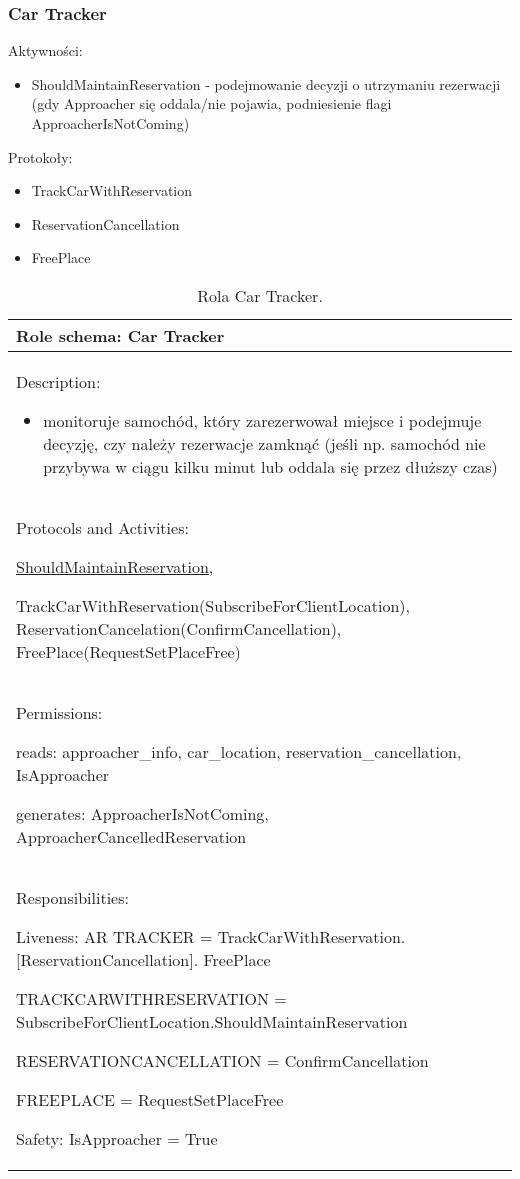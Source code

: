 \newpage
\subsubsection{Car Tracker}

Aktywności:
\begin{itemize}
    \item ShouldMaintainReservation - podejmowanie decyzji o utrzymaniu rezerwacji (gdy Approacher się oddala/nie pojawia, podniesienie flagi ApproacherIsNotComing)
\end{itemize}

Protokoły:
\begin{itemize}
    \item TrackCarWithReservation 
    \item ReservationCancellation
    \item FreePlace 
\end{itemize}


\begin{table}[!h] \label{tab:rola1} \centering
    \caption{Rola Car Tracker.}
    \begin{tabular} {| p{14cm} |} \hline
        Role schema: Car Tracker \\ \hline
        Description:

        \begin{itemize}
            \item monitoruje samochód, który zarezerwował miejsce i podejmuje decyzję, czy należy rezerwacje zamknąć (jeśli np. samochód nie przybywa w ciągu kilku minut lub oddala się przez dłuższy czas)
        \end{itemize} \\ \hline
        Protocols and Activities: 
        
        \ul{ShouldMaintainReservation}, 
        
        TrackCarWithReservation(SubscribeForClientLocation), ReservationCancelation(ConfirmCancellation), FreePlace(RequestSetPlaceFree) \\ \hline
        Permissions:

        reads: approacher\_info, car\_location,  reservation\_cancellation, IsApproacher

        generates:  ApproacherIsNotComing, ApproacherCancelledReservation                                                                                   \\ \hline
        Responsibilities:

        Liveness: AR TRACKER = TrackCarWithReservation.[ReservationCancellation]. FreePlace

        TRACKCARWITHRESERVATION = SubscribeForClientLocation.ShouldMaintainReservation

        RESERVATIONCANCELLATION = ConfirmCancellation

        FREEPLACE = RequestSetPlaceFree        

        Safety: IsApproacher = True \\ \hline
    \end{tabular}
\end{table}

